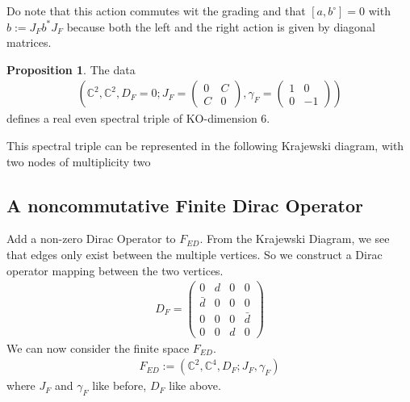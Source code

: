 \documentclass[a4paper]{article}
\theoremstyle{definition}
\theoremstyle{definition}
\theoremstyle{definition}
\theoremstyle{theorem}
\theoremstyle{theorem}
\theoremstyle{theorem}
\newtheorem{proposition}{Proposition}
\begin{document}
Do note that this action commutes wit the grading and that
$[a, b^\circ] = 0$ with $b:= J_F b^*J_F$  because both the left and the right
action is given by diagonal matrices.
\begin{proposition}
    The data
    \begin{align}
        \left( \mathbb{C}^2, \mathbb{C}^2, D_F=0; J_F =
        \begin{pmatrix}
            0 & C \\ C &0
        \end{pmatrix},
        \gamma _F =
        \begin{pmatrix}
            1 & 0 \\ 0 &-1
        \end{pmatrix}
        \right)
    \end{align}
    defines a real even spectral triple of KO-dimension 6.
\end{proposition}
This spectral triple can be represented in the following Krajewski diagram,
with two nodes of multiplicity two
    \begin{figure}[h!] \centering
    \end{figure}
\subsection{A noncommutative Finite Dirac Operator}
Add a non-zero Dirac Operator to $F_{ED}$. From the Krajewski Diagram, we see
that edges only exist between the multiple vertices. So we construct a Dirac
operator mapping between the two vertices.
\begin{align}
    D_F =
    \begin{pmatrix}
    0 & d & 0 & 0 \\
    \bar{d} & 0 & 0 & 0 \\
    0 & 0 & 0 & \bar{d} \\
    0 & 0 & d & 0
    \end{pmatrix}
\end{align}
We can now consider the finite space $F_{ED}$.
\begin{align}
    F_{ED} := (\mathbb{C}^2, \mathbb{C}^4, D_F; J_F, \gamma_F)
\end{align}
where $J_F$ and $\gamma_F$ like before, $D_F$ like above.
\end{document}
